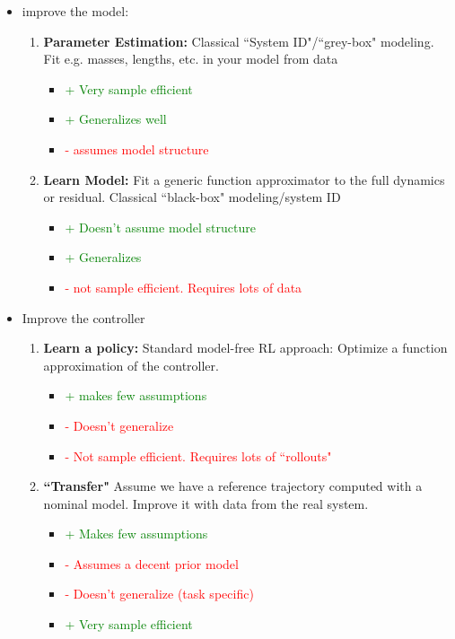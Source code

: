 \documentclass[11pt]{article}
\begin{document}
    \begin{itemize}
    \item improve the model:
    \begin{enumerate}
        \item \textbf{Parameter Estimation:} Classical ``System ID"/``grey-box" modeling. Fit e.g. masses, lengths, etc. in your model from data
        \begin{itemize}
            \item \textcolor{green}{+ Very sample efficient}
            \item \textcolor{green}{+ Generalizes well}
            \item \textcolor{red}{- assumes model structure}
        \end{itemize}
        \item \textbf{Learn Model:} Fit a generic function approximator to the full dynamics or residual. Classical ``black-box" modeling/system ID
        \begin{itemize}
            \item \textcolor{green}{+ Doesn't assume model structure}
            \item \textcolor{green}{+ Generalizes}
            \item \textcolor{red}{- not sample efficient. Requires lots of data}
        \end{itemize}
    \end{enumerate}
        \item Improve the controller
        \begin{enumerate}
        \item \textbf{Learn a policy:} Standard model-free RL approach: Optimize a function approximation of the controller.
        \begin{itemize}
            \item \textcolor{green}{+ makes few assumptions}
            \item \textcolor{red}{- Doesn't generalize}
            \item \textcolor{red}{- Not sample efficient. Requires lots of ``rollouts"}
        \end{itemize}
        \item \textbf{``Transfer"} Assume we have a reference trajectory computed with a nominal model. Improve it with data from the real system.
        \begin{itemize}
            \item \textcolor{green}{+ Makes few assumptions}
            \item \textcolor{red}{- Assumes a decent prior model}
            \item \textcolor{red}{- Doesn't generalize (task specific)}
            \item \textcolor{green}{+ Very sample efficient}
        \end{itemize}
    \end{enumerate}
    \end{itemize}
\end{document}
